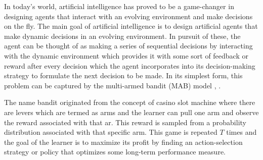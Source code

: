 

In today's world, artificial intelligence has proved to be a game-changer in designing agents that interact with an evolving environment and make decisions on the fly. The main goal of artificial intelligence is to design artificial agents that make dynamic decisions in an evolving environment. In pursuit of these, the agent can be thought of as making a series of sequential decisions by interacting with the dynamic environment which provides it with some sort of feedback or reward after every decision which the agent incorporates into its decision-making strategy to formulate the next decision to be made. In its simplest form, this problem can be captured by the multi-armed bandit (MAB) model \citep{bertsekas1996neuro}, \citep{sutton1998reinforcement}. 

	The name bandit originated from the concept of casino slot machine where there are levers which are termed as arms and the learner can pull one arm and observe the reward associated with that ar. This reward is sampled from a probability  distribution associated with that specific arm. This game is repeated $T$ times and the goal of the learner is to maximize its profit by finding an action-selection strategy or policy that optimizes some long-term performance measure. 
	


